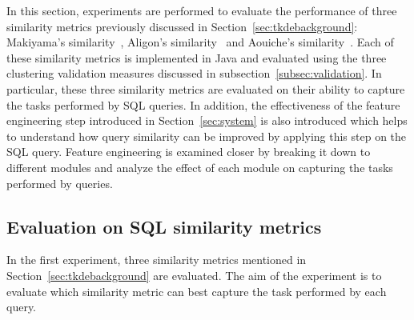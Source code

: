 In this section, experiments are performed to evaluate the performance of three similarity metrics previously discussed in Section~\ref{sec:tkdebackground}: Makiyama's similarity~\cite{makiyama2015text}, Aligon's similarity~\cite{aligon2014similarity} and Aouiche's similarity~\cite{aouiche2006}. 
Each of these similarity metrics is implemented in Java and evaluated using the three clustering validation measures discussed in subsection~\ref{subsec:validation}.
In particular, these three similarity metrics are evaluated on their ability to capture the tasks performed by SQL queries.
In addition, the effectiveness of the feature engineering step introduced in Section~\ref{sec:system} is also introduced which helps to understand how query similarity can be improved by applying this step on the SQL query.
Feature engineering is examined closer by breaking it down to different modules and analyze the effect of each module on capturing the tasks performed by queries.

\subsection{Evaluation on SQL similarity metrics}
\label{subsec:experiments}

In the first experiment, three similarity metrics mentioned in Section~\ref{sec:tkdebackground} are evaluated.
The aim of the experiment is to evaluate which similarity metric can best capture the task performed by each query.

